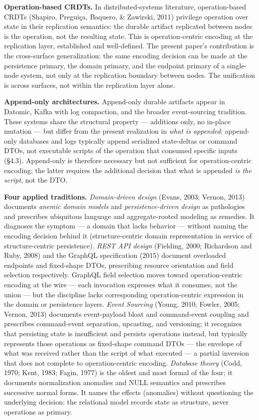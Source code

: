 \documentclass[
]{article}
\begin{document}
\textbf{Operation-based CRDTs.} In distributed-systems literature,
operation-based CRDTs (Shapiro, Preguiça, Baquero, \& Zawirski, 2011)
privilege operation over state in their replication semantics: the
durable artifact replicated between nodes is the operation, not the
resulting state. This is operation-centric encoding at the replication
layer, established and well-defined. The present paper's contribution is
the cross-surface generalization: the same encoding decision can be made
at the persistence primary, the domain primary, and the endpoint primary
of a single-node system, not only at the replication boundary between
nodes. The unification is across surfaces, not within the replication
layer alone.

\textbf{Append-only architectures.} Append-only durable artifacts appear
in Datomic, Kafka with log compaction, and the broader event-sourcing
tradition. These systems share the structural property --- additions
only, no in-place mutation --- but differ from the present realization
in \emph{what is appended}: append-only databases and logs typically
append serialized state-deltas or command DTOs, not executable scripts
of the operation that consumed specific inputs (§4.3). Append-only is
therefore necessary but not sufficient for operation-centric encoding;
the latter requires the additional decision that what is appended
\emph{is the script}, not the DTO.

\textbf{Four applied traditions.} \emph{Domain-driven design} (Evans,
2003; Vernon, 2013) documents \emph{anemic domain models} and
\emph{persistence-driven design} as pathologies and prescribes
ubiquitous language and aggregate-rooted modeling as remedies. It
diagnoses the symptom --- a domain that lacks behavior --- without
naming the encoding decision behind it (structure-centric domain
representation in service of structure-centric persistence). \emph{REST
API design} (Fielding, 2000; Richardson and Ruby, 2008) and the GraphQL
specification (2015) document overloaded endpoints and fixed-shape DTOs,
prescribing resource orientation and field selection respectively.
GraphQL field selection moves toward operation-centric encoding at the
wire --- each invocation expresses what it consumes, not the union ---
but the discipline lacks corresponding operation-centric expression in
the domain or persistence layers. \emph{Event Sourcing} (Young, 2010;
Fowler, 2005; Vernon, 2013) documents event-payload bloat and
command-event coupling and prescribes command-event separation,
upcasting, and versioning; it recognizes that persisting state is
insufficient and persists operations instead, but typically represents
those operations as fixed-shape command DTOs --- the envelope of what
was received rather than the script of what executed --- a partial
inversion that does not complete to operation-centric encoding.
\emph{Database theory} (Codd, 1970; Kent, 1983; Fagin, 1977) is the
oldest and most formal of the four; it documents normalization anomalies
and NULL semantics and prescribes successive normal forms. It names the
effects (anomalies) without questioning the underlying decision: the
relational model records state as structure, never operations as
primary.
\end{document}
